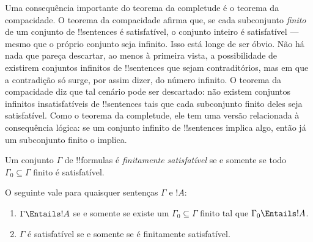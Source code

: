 \documentclass[../../../include/open-logic-section]{subfiles}
\begin{document}
      {}
      {}


Uma consequência importante do teorema da completude é o
teorema da compacidade.  O teorema da compacidade afirma que, se cada
subconjunto \emph{finito} de um conjunto de !!{sentence}s é satisfatível, o
conjunto inteiro é satisfatível --- mesmo que o próprio conjunto seja infinito. Isso
está longe de ser óbvio. Não há nada que pareça descartar, ao menos à primeira
vista, a possibilidade de existirem conjuntos infinitos de
!!{sentence}s que sejam contraditórios, mas em que a contradição só
surge, por assim dizer, do número infinito.  O teorema da compacidade
diz que tal cenário pode ser descartado: não existem
conjuntos infinitos insatisfatíveis de !!{sentence}s tais que cada subconjunto finito
deles seja satisfatível. Como o teorema da completude, ele tem uma versão
relacionada à consequência lógica: se um conjunto infinito de !!{sentence}s implica
algo, então já um subconjunto finito o implica.

\begin{defn}
  Um conjunto $\Gamma$ de !!{formula}s é \emph{finitamente satisfatível} se e somente se todo $\Gamma_0 \subseteq \Gamma$ finito é satisfatível.
\end{defn}

\begin{thm}
O seguinte vale para quaisquer sentenças $\Gamma$ e $!A$:
\begin{enumerate}
  \item $\Gamma \Entails !A$ se e somente se existe um $\Gamma_0
    \subseteq \Gamma$ finito tal que $\Gamma_0 \Entails !A$.
  \item $\Gamma$ é satisfatível se e somente se é finitamente
    satisfatível.
\end{enumerate}
\end{thm}
\end{document}
